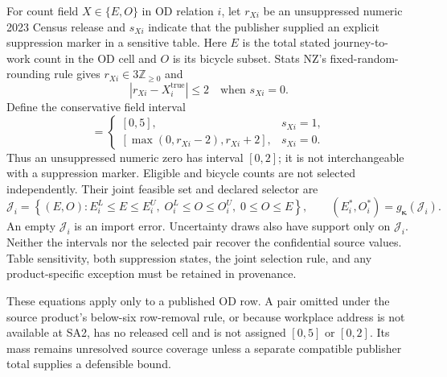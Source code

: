 For count field $X\in\{E,O\}$ in OD relation $i$, let $r_{Xi}$ be an
unsuppressed numeric 2023 Census release and $s_{Xi}$ indicate that the
publisher supplied an explicit suppression marker in a sensitive table. Here
$E$ is the total stated journey-to-work count in the OD cell and $O$ is its
bicycle subset. Stats NZ's fixed-random-rounding rule gives
$r_{Xi}\in3\mathbb{Z}_{\ge0}$ and
\begin{equation}
  |r_{Xi}-X_i^{\mathrm{true}}|\le2
  \quad\text{when }s_{Xi}=0.
\label{eq:frr3-bound}
\end{equation}
Define the conservative field interval
\begin{equation}
[X_i^L,X_i^U]=
\begin{cases}
[0,5], & s_{Xi}=1,\\
[\max(0,r_{Xi}-2),r_{Xi}+2], & s_{Xi}=0.
\end{cases}
\label{eq:censored-count-interval}
\end{equation}
Thus an unsuppressed numeric zero has interval $[0,2]$; it is not
interchangeable with a suppression marker. Eligible and bicycle counts are not
selected independently. Their joint feasible set and declared selector are
\begin{equation}
\mathcal J_i=
\left\{(E,O):E_i^L\le E\le E_i^U,\;
O_i^L\le O\le O_i^U,\;0\le O\le E\right\},
\qquad
(E_i^*,O_i^*)=g_{\boldsymbol\kappa}(\mathcal J_i).
\label{eq:censored-count-point}
\end{equation}
An empty $\mathcal J_i$ is an import error. Uncertainty draws also have support
only on $\mathcal J_i$. Neither the intervals nor the selected pair recover the
confidential source values. Table sensitivity, both suppression states, the
joint selection rule, and any product-specific exception must be retained in
provenance.

These equations apply only to a published OD row. A pair omitted under the
source product's below-six row-removal rule, or because workplace address is not
available at SA2, has no released cell and is not assigned $[0,5]$ or $[0,2]$.
Its mass remains unresolved source coverage unless a separate compatible
publisher total supplies a defensible bound.
